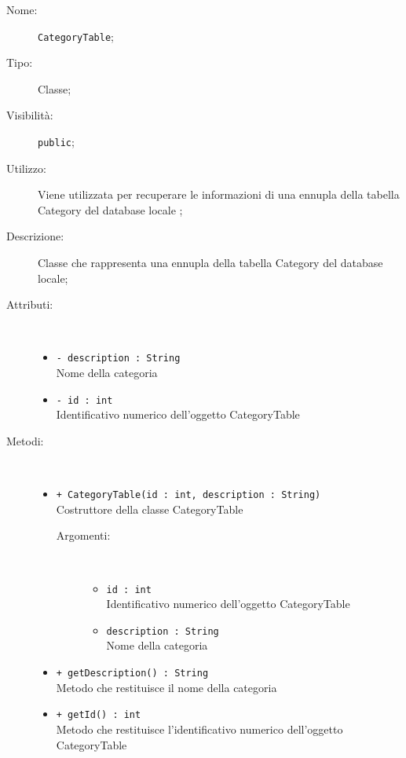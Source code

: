 \documentclass[../DefinizioneDiProdotto.tex]{subfiles}
\begin{document}
\begin{description}
	\item[Nome:] \texttt{CategoryTable};
	\item[Tipo:] Classe;
	\item[Visibilità:] \texttt{public};
	\item[Utilizzo:] Viene utilizzata per recuperare le informazioni di una ennupla della tabella Category del database locale ;
	\item[Descrizione:] Classe che rappresenta una ennupla della tabella Category del database locale;
	\item[Attributi:] \
	\begin{itemize}
		\item \texttt{- description : String}\\
		Nome della categoria
		
		\item \texttt{- id : int}\\
		Identificativo numerico dell'oggetto CategoryTable
		
	\end{itemize}
	\item[Metodi:] \
	\begin{itemize}
		\item \texttt{+ CategoryTable(id : int, description : String)}\\
		Costruttore della classe CategoryTable
		\begin{description}
			\item[Argomenti:] \
			\begin{itemize}
				\item \texttt{id : int}\\
				Identificativo numerico dell'oggetto CategoryTable\item \texttt{description : String}\\
				Nome della categoria\end{itemize}
		\end{description}
		\item \texttt{+ getDescription() : String}\\
		Metodo che restituisce il nome della categoria
		\item \texttt{+ getId() : int}\\
		Metodo che restituisce l'identificativo numerico dell'oggetto CategoryTable
	\end{itemize}
\end{description}
\end{document}
